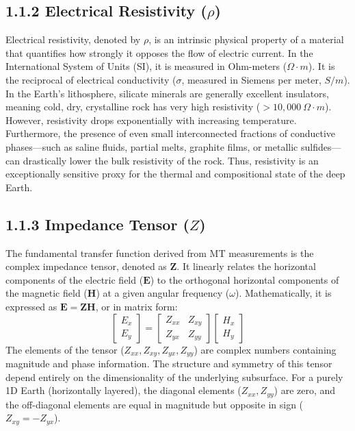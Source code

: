 \subsection{1.1.2 Electrical Resistivity ($\rho$)}
Electrical resistivity, denoted by $\rho$, is an intrinsic physical property of a material that quantifies how strongly it opposes the flow of electric current. In the International System of Units (SI), it is measured in Ohm-meters ($\Omega \cdot m$). It is the reciprocal of electrical conductivity ($\sigma$, measured in Siemens per meter, $S/m$). In the Earth's lithosphere, silicate minerals are generally excellent insulators, meaning cold, dry, crystalline rock has very high resistivity ($>10,000 \ \Omega \cdot m$). However, resistivity drops exponentially with increasing temperature. Furthermore, the presence of even small interconnected fractions of conductive phases—such as saline fluids, partial melts, graphite films, or metallic sulfides—can drastically lower the bulk resistivity of the rock. Thus, resistivity is an exceptionally sensitive proxy for the thermal and compositional state of the deep Earth.

\subsection{1.1.3 Impedance Tensor ($Z$)}
The fundamental transfer function derived from MT measurements is the complex impedance tensor, denoted as $\mathbf{Z}$. It linearly relates the horizontal components of the electric field ($\mathbf{E}$) to the orthogonal horizontal components of the magnetic field ($\mathbf{H}$) at a given angular frequency ($\omega$). Mathematically, it is expressed as $\mathbf{E} = \mathbf{Z}\mathbf{H}$, or in matrix form:
\begin{equation}
\begin{bmatrix} E_x \\ E_y \end{bmatrix} = \begin{bmatrix} Z_{xx} & Z_{xy} \\ Z_{yx} & Z_{yy} \end{bmatrix} \begin{bmatrix} H_x \\ H_y \end{bmatrix}
\end{equation}
The elements of the tensor ($Z_{xx}, Z_{xy}, Z_{yx}, Z_{yy}$) are complex numbers containing magnitude and phase information. The structure and symmetry of this tensor depend entirely on the dimensionality of the underlying subsurface. For a purely 1D Earth (horizontally layered), the diagonal elements ($Z_{xx}, Z_{yy}$) are zero, and the off-diagonal elements are equal in magnitude but opposite in sign ($Z_{xy} = -Z_{yx}$).

